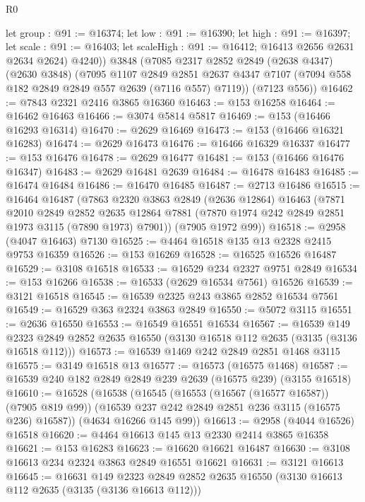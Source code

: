 \begin{lexlean}{R0}
\begin{coremodule}
        let group : @91 := @16374;
        let low : @91 := @16390;
        let high : @91 := @16397;
        let scale : @91 := @16403; let scaleHigh : @91 := @16412; @16413 @2656 @2631 @2634 @2624)
        @4240))
    @3848
    (@7085
      @2317
      @2852
      @2849
      (@2638 @4347)
      (@2630 @3848)
      (@7095
        @1107
        @2849
        @2851
        @2637
        @4347
        @7107
        (@7094 @558 @182 @2849 @2849 @557 @2639 (@7116 @557) @7119))
      (@7123 @556))
@16462 := @7843 @2321 @2416 @3865 @16360
@16463 := @153 @16258
@16464 := @16462 @16463
@16466 := @3074 @5814 @5817
@16469 := @153 (@16466 @16293 @16314)
@16470 := @2629 @16469
@16473 := @153 (@16466 @16321 @16283)
@16474 := @2629 @16473
@16476 := @16466 @16329 @16337
@16477 := @153 @16476
@16478 := @2629 @16477
@16481 := @153 (@16466 @16476 @16347)
@16483 := @2629 @16481 @2639
@16484 := @16478 @16483
@16485 := @16474 @16484
@16486 := @16470 @16485
@16487 := @2713 @16486
@16515 := @16464
    @16487
    (@7863
      @2320
      @3863
      @2849
      (@2636 @12864)
      @16463
      (@7871
        @2010
        @2849
        @2852
        @2635
        @12864
        @7881
        (@7870 @1974 @242 @2849 @2851 @1973 @3115 (@7890 @1973) @7901))
      (@7905 @1972 @99))
@16518 := @2958 (@4047 @16463) @7130
@16525 := @4464 @16518 @135 @13 @2328 @2415 @9753 @16359
@16526 := @153 @16269
@16528 := @16525 @16526 @16487
@16529 := @3108 @16518
@16533 := @16529 @234 @2327 @9751 @2849
@16534 := @153 @16266
@16538 := @16533 (@2629 @16534 @7561) @16526
@16539 := @3121 @16518
@16545 := @16539 @2325 @243 @3865 @2852 @16534 @7561
@16549 := @16529 @363 @2324 @3863 @2849
@16550 := @5072 @3115
@16551 := @2636 @16550
@16553 := @16549 @16551 @16534
@16567 := @16539
    @149
    @2323
    @2849
    @2852
    @2635
    @16550
    (@3130 @16518 @112 @2635 (@3135 (@3136 @16518 @112)))
@16573 := @16539 @1469 @242 @2849 @2851 @1468 @3115
@16575 := @3149 @16518 @13
@16577 := @16573 (@16575 @1468)
@16587 := @16539 @240 @182 @2849 @2849 @239 @2639 (@16575 @239) (@3155 @16518)
@16610 := @16528
    (@16538
      (@16545
        (@16553 (@16567 (@16577 @16587)) (@7905 @819 @99))
        (@16539 @237 @242 @2849 @2851 @236 @3115 (@16575 @236) @16587))
      (@4634 @16266 @145 @99))
@16613 := @2958 (@4044 @16526) @16518
@16620 := @4464 @16613 @145 @13 @2330 @2414 @3865 @16358
@16621 := @153 @16283
@16623 := @16620 @16621 @16487
@16630 := @3108 @16613 @234 @2324 @3863 @2849 @16551 @16621
@16631 := @3121 @16613
@16645 := @16631
    @149
    @2323
    @2849
    @2852
    @2635
    @16550
    (@3130 @16613 @112 @2635 (@3135 (@3136 @16613 @112)))

\end{coremodule}
\end{lexlean}
